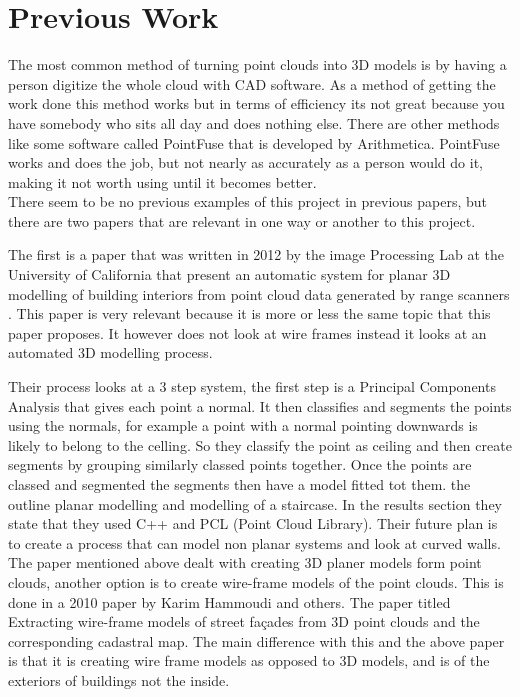 

\section{Previous Work}

	The most common method of turning point clouds into 3D models is by having a person digitize the whole cloud with CAD software. As a method of getting the work done this method works but in terms of efficiency its not great because you have somebody who sits all day and does nothing else. There are other methods like some software called PointFuse that is developed by Arithmetica. PointFuse works and does the job, but not nearly as accurately as a person would do it, making it not worth using until it becomes better.\\

	
	There seem to be no previous examples of this project in previous papers, but there are two papers that are relevant in one way or another to this project.
	
	The first is a paper that was written in 2012 by the image Processing Lab at the University of California that present an automatic system for planar 3D modelling of building interiors from point cloud data generated by range scanners \cite{VS12}. This paper is very relevant because it is more or less the same topic that this paper proposes. It however does not look at wire frames instead it looks at an automated 3D modelling process.
	
	Their process looks at a 3 step system, the first step is a Principal Components Analysis that gives each point a normal.
	It then classifies and segments the points using the normals, for example a point with a normal pointing downwards is likely to belong to the celling. So they classify the point as ceiling and then create segments by grouping similarly classed points together.
	Once the points are classed and segmented the segments then have a model fitted tot them. the outline planar modelling and modelling of a staircase. In the results section they state that they used C++ and PCL (Point Cloud Library). Their future plan is to create a process that can model non planar systems and look at curved walls.\\
	
	
	The paper mentioned above dealt with creating 3D planer models form point clouds, another option is to create wire-frame models of the point clouds. This is done in a 2010 paper by Karim Hammoudi and others\cite{Ham12}. The paper titled Extracting wire-frame models of street fa\c{c}ades from 3D point clouds and the corresponding cadastral map. The main difference with this and the above paper is that it is creating wire frame models as opposed to 3D models, and is of the exteriors of buildings not the inside.
	
